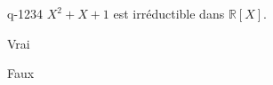 \begin{truefalse}{q-1234}
$X^2+X+1$ est irréductible dans $\mathbb{R}[X]$.
\item* Vrai
\item Faux
\end{truefalse}